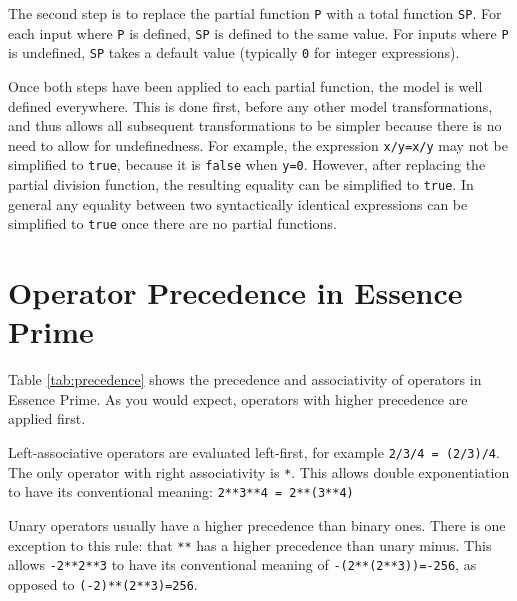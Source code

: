 \documentclass[a4paper]{article}
\newcommand{\eprime}{{\sc Essence Prime}\xspace}
\begin{document}
The second step is to replace the partial function \texttt{P} with a total function \texttt{SP}.
For each input where \texttt{P} is defined, \texttt{SP} is defined to the same value. For inputs where \texttt{P} is 
undefined, \texttt{SP} takes a default value (typically \texttt{0} for integer expressions).

Once both steps have been applied to each partial function, the model is well
defined everywhere. This is done first, before any other model transformations,
and thus allows all subsequent transformations to be simpler because there is no
need to allow for undefinedness. 
For example, the expression \texttt{x/y=x/y} may not be simplified to \texttt{true},
because it is \texttt{false} when \texttt{y=0}. However, after replacing the partial
division function, the resulting equality can be simplified to \texttt{true}.  In
general any equality between two syntactically identical expressions can be simplified
to \texttt{true} once there are no partial functions. 




\appendix

\section{Operator Precedence in \eprime}\label{app:op}

Table \ref{tab:precedence} shows the precedence and associativity of operators
in \eprime. As you would expect, operators with higher precedence are applied first.

Left-associative operators are evaluated left-first, for example {\tt 2/3/4 = (2/3)/4}.
The only operator with right associativity is {\tt **}. This allows double
exponentiation to have its conventional meaning: {\tt 2**3**4 = 2**(3**4)}

Unary operators usually have a higher precedence than binary ones. There is one
exception to this rule: that \texttt{**} has a higher precedence than unary minus. 
This allows \texttt{-2**2**3} to have its conventional meaning 
of \texttt{-(2**(2**3))=-256}, as opposed to \texttt{(-2)**(2**3)=256}.
\end{document}
